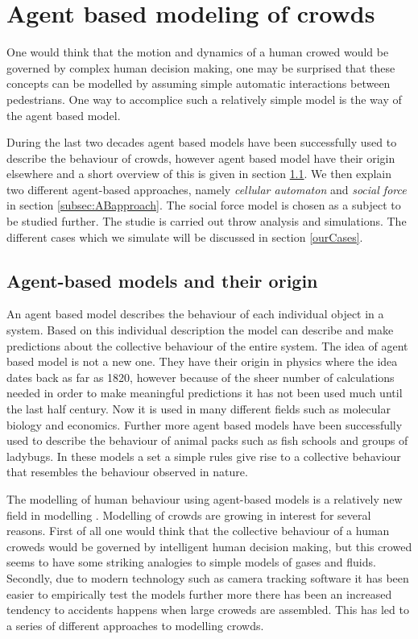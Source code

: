 \section{Agent based modeling of crowds}
\label{sec:crowds}
One would think that the motion and dynamics of a human crowed would be governed by complex human decision making, one may be surprised that these concepts can be modelled by assuming simple automatic interactions between pedestrians. One way to accomplice such a relatively simple model is the way of the agent based model.

During the last two decades agent based models have been successfully used to 
describe the behaviour of crowds, however agent based model have their 
origin elsewhere and a short overview of this is given in section \ref{subsec:ABM}. We then explain two different agent-based approaches, namely \emph{cellular automaton} and \emph{social force} in section \ref{subsec:ABapproach}. The social force model is chosen as a subject to be studied further. The studie is carried out throw analysis and simulations. The different cases which we simulate will be discussed in section \ref{ourCases}.

\subsection{Agent-based models and their origin}\label{subsec:ABM}
An agent based model describes the behaviour of each individual object in a system. Based on this individual description the model can describe and make predictions about the collective behaviour of the entire system. The idea of agent based model is not a new one. They have their origin in physics where the idea dates back as far as 1820, however because of the sheer number of calculations needed in order to make meaningful predictions it has not been used much until the last half century\cite{simintro}. Now it is used in many different fields such as molecular biology and economics\cite{MDbio}. Further more agent based models have been successfully used to describe the behaviour of animal packs such as fish schools and groups of ladybugs. In these models a set a simple rules give rise to a collective behaviour that resembles the behaviour observed in nature. 

The modelling of human behaviour using agent-based models is a relatively new field in modelling \cite{helbing00}. Modelling of crowds are growing in interest for several reasons. First of all one would think that the collective behaviour of a human croweds would be governed by intelligent human decision making, but this crowed seems to have some striking analogies to simple models of gases and fluids. Secondly, due to modern technology such as camera tracking software it has been easier to empirically test the models further more there has been an increased tendency to accidents happens when large croweds are assembled. This has led to a series of different approaches to modelling crowds. 

